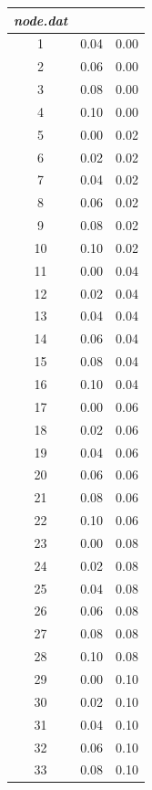 \documentclass[11pt]{amsart}
\begin{document}
\begin{table}[t]
    \scriptsize
    \begin{tabular}[t]{c c c}
        	\textit{node.dat} & & \\ \hline
        1    &   0.04  &  0.00\\
        2    &   0.06  &  0.00\\
        3    &   0.08  &  0.00\\
        4    &   0.10  &  0.00\\
        5    &   0.00  &  0.02\\
        6    &   0.02  &  0.02\\
        7    &  0.04   & 0.02\\
        8    &   0.06  &  0.02\\
        9    &   0.08  &  0.02\\
        10  &   0.10  &  0.02\\
        11  &    0.00  &   0.04\\
        12  &    0.02  &   0.04\\
        13  &    0.04  &   0.04\\
        14  &    0.06  &  0.04\\
        15  &    0.08  &  0.04\\
        16  &    0.10  &  0.04\\
        17  &    0.00  &  0.06\\
        18  &    0.02  &  0.06\\
        19  &    0.04  &  0.06\\
        20  &    0.06  &  0.06\\
        21  &    0.08  &  0.06\\
        22  &    0.10  &  0.06\\
        23  &    0.00  &  0.08\\
        24  &    0.02  &  0.08\\
        25  &    0.04  &  0.08\\
        26  &    0.06  &  0.08\\
        27  &    0.08  &  0.08\\
        28  &    0.10  &  0.08\\
        29  &    0.00  &  0.10\\
        30  &    0.02  &  0.10\\
        31  &    0.04  &  0.10\\
        32  &    0.06  &  0.10\\
        33  &    0.08  &  0.10\\

\end{tabular}
\end{table}
\end{document}
